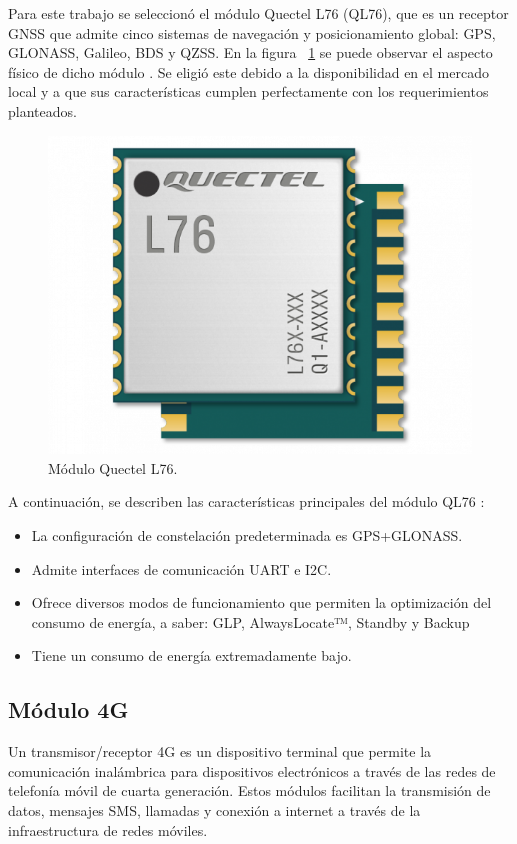 Para este trabajo se seleccionó el módulo Quectel L76 (QL76), que es un receptor GNSS que admite cinco sistemas de navegación y posicionamiento global: GPS, GLONASS, Galileo, BDS y QZSS. En la figura ~\ref{fig:QL76} se puede observar el aspecto físico de dicho módulo \citep{QL76}. Se eligió este debido a la disponibilidad en el mercado local y a que sus características cumplen perfectamente con los requerimientos planteados. 

\vspace{1cm}

\begin{figure}[htbp]
	\centering
	\includegraphics[width=.5\textwidth]{./Figures/QL76.png}
	\caption{Módulo Quectel L76\protect\footnotemark.}
	\label{fig:QL76}
\end{figure}

A continuación, se describen las características principales del módulo QL76 \citep{QL76}:

\begin{itemize}
    \item La configuración de constelación predeterminada es GPS+GLONASS.
    \item Admite interfaces de comunicación UART e I2C. 
    \item Ofrece diversos modos de funcionamiento que permiten la optimización del consumo de energía, a saber: GLP, AlwaysLocate™, Standby y Backup
    \item Tiene un consumo de energía extremadamente bajo.
\end{itemize}

 

\subsection{Módulo 4G}
\label{sec:SIMA7670SA}

Un transmisor/receptor 4G es un dispositivo terminal que permite la comunicación inalámbrica para dispositivos electrónicos a través de las redes de telefonía móvil de cuarta generación. Estos módulos facilitan la transmisión de datos, mensajes SMS, llamadas y conexión a internet a través de la infraestructura de redes móviles.

